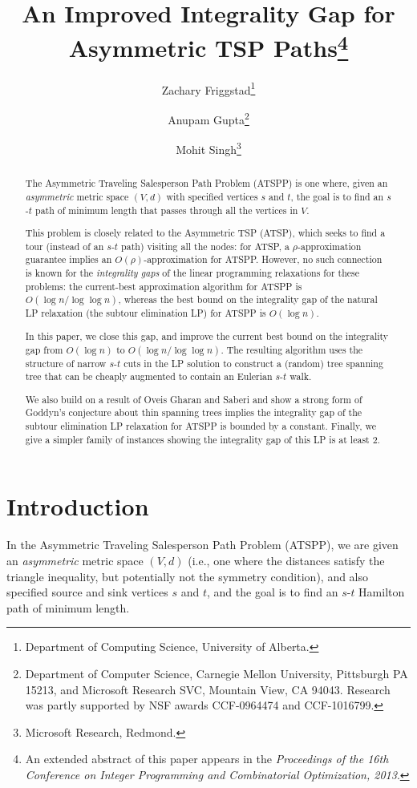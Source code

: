 \documentclass[11pt]{article}
\title{An Improved Integrality Gap for Asymmetric TSP Paths\thanks{An
    extended abstract of this paper appears in the \emph{Proceedings of
      the 16th Conference on Integer Programming and Combinatorial
      Optimization, 2013}.}}
\author{
Zachary Friggstad\thanks{Department of Computing Science, University of Alberta.}
\and
Anupam Gupta\thanks{Department of Computer Science, Carnegie Mellon University, Pittsburgh
    PA 15213, and Microsoft Research SVC, Mountain View, CA
    94043. Research was partly supported by NSF awards CCF-0964474 and
    CCF-1016799.}
\and
Mohit Singh\thanks{Microsoft Research, Redmond.}
}
\theoremstyle{definition}
\begin{document}
\maketitle

\begin{abstract}

  \bigskip
  The Asymmetric Traveling Salesperson Path Problem (ATSPP) is one
  where, given an \emph{asymmetric} metric space $(V,d)$ with specified
  vertices $s$ and $t$, the goal is to find an $s$-$t$ path of minimum
  length that passes through all the vertices in $V$.

  \medskip
  This problem is closely related to the Asymmetric TSP (ATSP),
  which seeks to find a tour (instead of an $s$-$t$ path) visiting all
  the nodes: for ATSP, a $\rho$-approximation guarantee implies an
  $O(\rho)$-approximation for ATSPP. However, no such connection is
  known for the \emph{integrality gaps} of the linear programming
  relaxations for these problems: the current-best approximation
  algorithm for ATSPP is $O(\log n/\log\log n)$, whereas the best bound
  on the integrality gap of the natural LP relaxation (the subtour
  elimination LP) for ATSPP is $O(\log n)$.

  \medskip
  In this paper, we close this gap, and improve the current best bound
  on the integrality gap from $O(\log n)$ to $O(\log n/\log\log n)$. The
  resulting algorithm uses the structure of narrow $s$-$t$ cuts in the
  LP solution to construct a (random) tree spanning tree that can be cheaply augmented
  to contain an Eulerian $s$-$t$ walk.

  \medskip
  We also build on a result of Oveis Gharan and Saberi and show
  a strong form of Goddyn's conjecture about thin spanning trees
  implies the integrality gap of the subtour elimination LP relaxation for ATSPP is bounded by a constant.
  Finally, we give a simpler family of instances showing the
  integrality gap of this LP is at least $2$.
\end{abstract}





\section{Introduction}
\label{sec:introduction}

In the Asymmetric Traveling Salesperson Path Problem (ATSPP), we are
given an \emph{asymmetric} metric space $(V,d)$ (i.e., one where the
distances satisfy the triangle inequality, but potentially not the
symmetry condition), and also specified source and sink vertices $s$ and
$t$, and the goal is to find an $s$-$t$ Hamilton path of minimum length.
\end{document}
